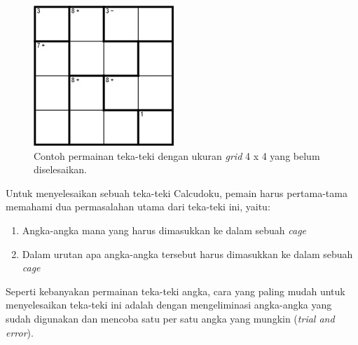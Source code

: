 \documentclass[a4paper,twoside]{article}
\begin{document}
\begin{enumerate}
\begin{figure}
\centering
\captionsetup{justification=centering}
\includegraphics[scale=1]{Gambar/Backtracking1}
\caption[Contoh permainan teka-teki Calcudoku dengan ukuran \textit{grid} 4 x 4 yang belum diselesaikan.  ~\cite{Fahda}]{Contoh permainan teka-teki dengan ukuran \textit{grid} 4 x 4 yang belum diselesaikan.  ~\cite{Fahda}}
\label{fig:backtracking1}
\end{figure}

Untuk menyelesaikan sebuah teka-teki Calcudoku, pemain harus pertama-tama memahami dua permasalahan utama dari teka-teki ini, yaitu:
\begin{enumerate}
\item Angka-angka mana yang harus dimasukkan ke dalam sebuah \textit{cage}
\item Dalam urutan apa angka-angka tersebut harus dimasukkan ke dalam sebuah \textit{cage}
\end{enumerate}

Seperti kebanyakan permainan teka-teki angka, cara yang paling mudah untuk menyelesaikan teka-teki ini adalah dengan mengeliminasi angka-angka yang sudah digunakan dan mencoba satu per satu angka yang mungkin (\textit{trial and error}).


\end{enumerate}
\end{document}
